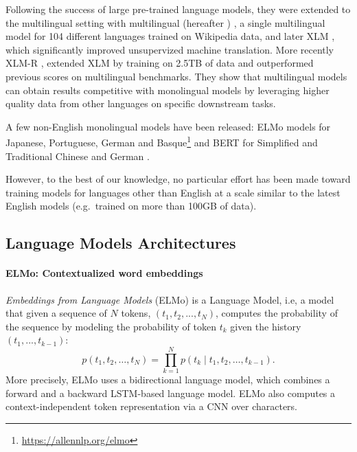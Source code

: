 Following the success of large pre-trained language models, they were extended to the multilingual setting with multilingual \bert (hereafter \mbert) \citep{devlin-etal-2019-bert}, a single multilingual model for 104 different languages trained on Wikipedia data, and later XLM \citep{conneau-lample-2019-cross}, which significantly improved unsupervized machine translation. More recently XLM-R \citep{conneau-etal-2020-unsupervised}, extended XLM by training on 2.5TB of data and outperformed previous scores on multilingual benchmarks. They show that multilingual models can obtain results competitive with monolingual models by leveraging higher quality data from other languages on specific downstream tasks.

A few non-English monolingual models have been released: ELMo models for Japanese, Portuguese, German and Basque\footnote{\url{https://allennlp.org/elmo}} and BERT for Simplified and Traditional Chinese \citep{devlin-etal-2019-bert} and German \citep{chan-etal-2019-german}.

However, to the best of our knowledge, no particular effort has been made toward training models for languages other than English at a scale similar to the latest English models (e.g.~\roberta trained on more than 100GB of data).

\subsection{Language Models Architectures}

\paragraph{ELMo: Contextualized word embeddings}
\emph{Embeddings from Language Models} (ELMo) \citep{peters-etal-2018-deep} is a Language Model, i.e, a model that given a sequence of $N$ tokens, $(t_1, t_2, ..., t_N)$, computes the probability of the sequence by modeling the probability of token $t_k$ given the history $(t_1, ..., t_{k-1})$:
\[
    p(t_1, t_2, \ldots, t_N) = \prod_{k=1}^N p({t_k} \mid t_1, t_2, \ldots, t_{k-1}).
\]
More precisely, ELMo uses a bidirectional language model, which combines a forward and a backward LSTM-based language model. ELMo also computes a context-independent token representation via a CNN over characters.

